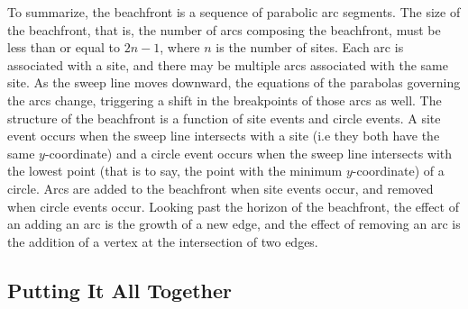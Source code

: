 \documentclass[12pt,twoside]{reedthesis}
\begin{document}
        To summarize, the beachfront is a sequence of parabolic arc segments. The size of the beachfront, that is, the number of arcs composing the beachfront, must be less than or equal to $2n-1$, where $n$ is the number of sites. Each arc is associated with a site, and there may be multiple arcs associated with the same site. As the sweep line moves downward, the equations of the parabolas governing the arcs change, triggering a shift in the breakpoints of those arcs as well. The structure of the beachfront is a function of site events and circle events. A site event occurs when the sweep line intersects with a site (i.e they both have the same $y$-coordinate) and a circle event occurs when the sweep line intersects with the lowest point (that is to say, the point with the minimum $y$-coordinate) of a circle. Arcs are added to the beachfront when site events occur, and removed when circle events occur. Looking past the horizon of the beachfront, the effect of an adding an arc is the growth of a new edge, and the effect of removing an arc is the addition of a vertex at the intersection of two edges.\par



    \subsection{Putting It All Together} %
    \label{sub:putting_it_all_together}
\end{document}
